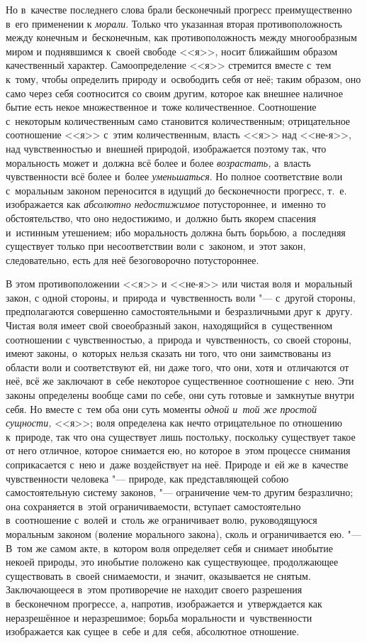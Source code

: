 Но в~качестве последнего слова брали бесконечный прогресс преимущественно в~его
применении к {\em морали}. Только что указанная вторая противоположность между
конечным и~бесконечным, как противоположность между многообразным миром и
поднявшимся к~своей свободе <<я>>, носит ближайшим образом качественный
характер. Самоопределение <<я>> стремится вместе с~тем к~тому, чтобы определить
природу и~освободить себя от неё; таким образом, оно само через себя
соотносится со своим другим, которое как внешнее наличное бытие есть некое
множественное и~тоже количественное. Соотношение с~некоторым количественным
само становится количественным; отрицательное соотношение <<я>> с~этим
количественным, власть <<я>> над <<не-я>>, над чувственностью и~внешней
природой, изображается поэтому так, что моральность может и~должна всё более и
более {\em возрастать,} а~власть чувственности всё более и~более
{\em уменьшаться}. Но полное соответствие воли с~моральным законом переносится
в идущий до бесконечности прогресс, т.~е. изображается как
{\em абсолютно недостижимое} потустороннее, и~именно то обстоятельство, что оно
недостижимо, и~должно быть якорем спасения и~истинным утешением; ибо
моральность должна быть борьбою, а~последняя существует только при
несоответствии воли с~законом, и~этот закон, следовательно, есть для неё
безоговорочно потустороннее.

В этом противоположении <<я>> и <<не-я>> или чистая воля и~моральный закон,
с одной стороны, и~природа и~чувственность воли "--- с~другой стороны,
предполагаются совершенно самостоятельными и~безразличными друг к~другу. Чистая
воля имеет свой своеобразный закон, находящийся в~существенном соотношении
с чувственностью, а~природа и~чувственность, со своей стороны, имеют законы,
о~которых нельзя сказать ни того, что они заимствованы из области воли и
соответствуют ей, ни даже того, что они, хотя и~отличаются от неё, всё же
заключают в~себе некоторое существенное соотношение с~нею. Эти законы
определены вообще сами по себе, они суть готовые и~замкнутые внутри себя. Но
вместе с~тем оба они суть моменты {\em одной и~той же простой сущности,} <<я>>;
воля определена как нечто отрицательное по отношению к~природе, так что она
существует лишь постольку, поскольку существует такое от него отличное, которое
снимается ею, но которое в~этом процессе снимания соприкасается с~нею и~даже
воздействует на неё. Природе и~ей же в~качестве чувственности человека "---
природе, как представляющей собою самостоятельную систему законов, "---
ограничение чем-то другим безразлично; она сохраняется в~этой ограничиваемости,
вступает самостоятельно в~соотношение с~волей и~столь же ограничивает волю,
руководящуюся моральным законом (воление морального закона), сколь и
ограничивается ею. "--- В~том же самом акте, в~котором воля определяет себя и
снимает инобытие некоей природы, это инобытие положено как существующее,
продолжающее существовать в~своей снимаемости, и~значит, оказывается не снятым.
Заключающееся в~этом противоречие не находит своего разрешения в~бесконечном
прогрессе, а, напротив, изображается и~утверждается как неразрешённое и
неразрешимое; борьба моральности и~чувственности изображается как сущее в~себе
и для~себя, абсолютное отношение.


